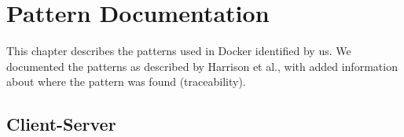 
\clearpage
\chapter{Pattern Documentation}
\label{ch:patterns}
This chapter describes the patterns used in Docker identified by us. We documented the patterns as described by Harrison et al.\cite{usingpatternscapture}, with added information about where the pattern was found (traceability).

\section{Client-Server}


